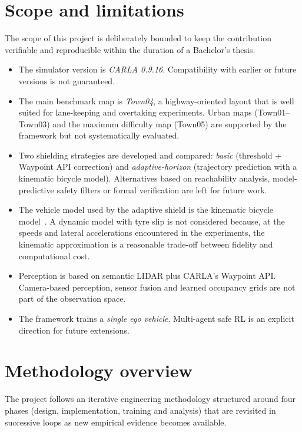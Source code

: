\section{Scope and limitations}\label{sec:intro-scope}

The scope of this project is deliberately bounded to keep the contribution verifiable and
reproducible within the duration of a Bachelor's thesis.

\begin{itemize}
  \item The simulator version is \emph{CARLA 0.9.16}. Compatibility with earlier or future
        versions is not guaranteed.
  \item The main benchmark map is \emph{Town04}, a highway-oriented layout that is well suited
        for lane-keeping and overtaking experiments. Urban maps (Town01--Town03) and the maximum
        difficulty map (Town05) are supported by the framework but not systematically evaluated.
  \item Two shielding strategies are developed and compared: \emph{basic} (threshold + Waypoint
        API correction) and \emph{adaptive-horizon} (trajectory prediction with a kinematic
        bicycle model). Alternatives based on reachability analysis, model-predictive safety
        filters or formal verification are left for future work.
  \item The vehicle model used by the adaptive shield is the kinematic bicycle
        model~\cite{rajamani2012vehicle}. A dynamic model with tyre slip is not considered because,
        at the speeds and lateral accelerations encountered in the experiments, the kinematic
        approximation is a reasonable trade-off between fidelity and computational cost.
  \item Perception is based on semantic LIDAR plus CARLA's Waypoint API. Camera-based perception,
        sensor fusion and learned occupancy grids are not part of the observation space.
  \item The framework trains a \emph{single ego vehicle}. Multi-agent safe RL is an explicit
        direction for future extensions.
\end{itemize}

\section{Methodology overview}\label{sec:intro-methodology}

The project follows an iterative engineering methodology structured around four phases (design,
implementation, training and analysis) that are revisited in successive loops as new empirical
evidence becomes available.

